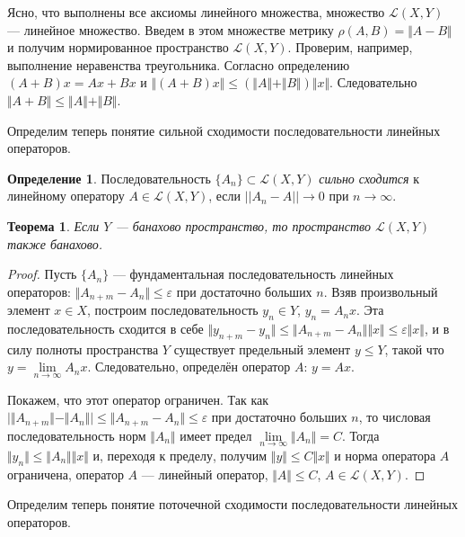\documentclass[12pt,a4paper,titlepage,oneside]{book}
\theoremstyle{definition}
\newtheorem*{definition}{Определение}
\theoremstyle{plain}
\newtheorem*{theorem}{Теорема}
\theoremstyle{break}
\theoremstyle{remark}
\theoremstyle{remark}
\theoremstyle{remark}
\theoremstyle{remark}
\theoremstyle{plain}
\theoremstyle{plain}
\begin{document}
Ясно, что выполнены все аксиомы линейного множества, множество $\mathcal{L}(X,Y)$ --- линейное множество. Введем в этом множестве метрику $\rho(A, B) = \Vert A-B \Vert$ и получим нормированное пространство $\mathcal{L}(X,Y)$. Проверим, например, выполнение неравенства треугольника. Согласно определению $(A+B)x = Ax+Bx$ и $\Vert(A+B)x\Vert\le(\Vert A\Vert+\Vert B\Vert)\Vert x\Vert$. Следовательно $\Vert A+B\Vert\le\Vert A\Vert+\Vert B\Vert$.

Определим теперь понятие сильной сходимости последовательности линейных операторов.

\begin{definition}
Последовательность $\{A_n\} \subset \mathcal{L}(X,Y)$ \textit{сильно сходится} к линейному оператору $A\in \mathcal{L}(X,Y)$, если $||A_n-A||\to 0$ при $n\to {\infty}$.
\end{definition}

\begin{theorem}
Если $Y$ --- банахово пространство, то пространство $\mathcal{L}(X,Y)$ также банахово.
\end{theorem}

\begin{proof}
Пусть $\{A_n\}$ --- фундаментальная последовательность линейных операторов: $\Vert A_{n+m} - A_n \Vert\le \varepsilon$ при достаточно больших $n$. Взяв произвольный элемент $x\in X$, построим последовательность $y_n\in Y$, $y_n=A_nx$. Эта последовательность сходится в себе $\Vert y_{n+m}-y_n\Vert\le \Vert A_{n+m}-A_n\Vert \Vert x\Vert\le \varepsilon \Vert x\Vert$, и в силу полноты пространства $Y$ существует предельный элемент $y \leqslant Y$, такой что $y=\lim \limits_{n \to \infty} A_n x$. Следовательно, определён оператор $A$: $y = Ax$.

Покажем, что этот оператор ограничен. Так как $ \big\lvert \Vert A_{n+m} \Vert - \Vert A_n\Vert \big\rvert \leqslant \Vert A_{n+m} - A_n \Vert \leqslant \varepsilon$ при достаточно больших $n$, то числовая последовательность норм $\Vert A_n\Vert$ имеет предел $\lim \limits_{n\to \infty} \Vert A_n\Vert=C$. Тогда $\Vert y_n \Vert \leqslant \Vert A_n\Vert \Vert x\Vert$ и, переходя к пределу, получим $\Vert y \Vert \leqslant C \Vert x \Vert$ и норма оператора $A$ ограничена, оператор $A$ --- линейный оператор, $\Vert A\Vert \leqslant C$, $A \in \mathcal{L}(X,Y)$.
\end{proof}

Определим теперь понятие поточечной сходимости последовательности линейных операторов.
\end{document}
